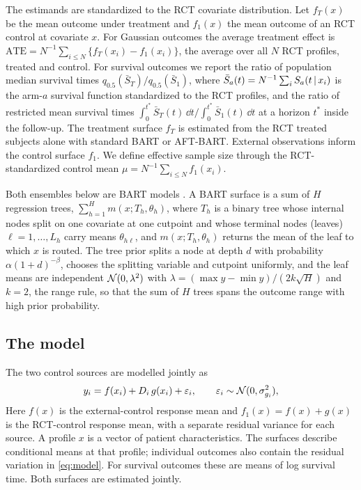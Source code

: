 The estimands are standardized to the RCT covariate distribution. Let $f_T(x)$ be the mean outcome under treatment and $f_1(x)$ the mean outcome of an RCT control at covariate $x$. For Gaussian outcomes the average treatment effect is $\mathrm{ATE}=N^{-1}\sum_{i\le N}\{f_T(x_i)-f_1(x_i)\}$, the average over all $N$ RCT profiles, treated and control. For survival outcomes we report the ratio of population median survival times $q_{0.5}(\bar S_T)/q_{0.5}(\bar S_1)$, where $\bar S_a(t)=N^{-1}\sum_i S_a(t\,\vert\, x_i)$ is the arm-$a$ survival function standardized to the RCT profiles, and the ratio of restricted mean survival times $\int_0^{t^\ast}\bar S_T(t)\,\dd t/\int_0^{t^\ast}\bar S_1(t)\,\dd t$ at a horizon $t^\ast$ inside the follow-up. The treatment surface $f_T$ is estimated from the RCT treated subjects alone with standard BART or AFT-BART. External observations inform the control surface $f_1$. We define effective sample size through the RCT-standardized control mean $\mu=N^{-1}\sum_{i\le N}f_1(x_i)$.

Both ensembles below are BART models \citep{Chipman2010BART}. A BART surface is a sum of $H$ regression trees, $\sum_{h=1}^H m(x;T_h,\theta_h)$, where $T_h$ is a binary tree whose internal nodes split on one covariate at one cutpoint and whose terminal nodes (leaves) $\ell=1,\dots,L_h$ carry means $\theta_{h\ell}$, and $m(x;T_h,\theta_h)$ returns the mean of the leaf to which $x$ is routed. The tree prior splits a node at depth $d$ with probability $\alpha(1+d)^{-\beta}$, chooses the splitting variable and cutpoint uniformly, and the leaf means are independent $\mathcal{N}(0,\lambda^2)$ with $\lambda=(\max y-\min y)/(2k\sqrt H)$ and $k=2$, the range rule, so that the sum of $H$ trees spans the outcome range with high prior probability.

\subsection{The model}
\label{sec:model}

The two control sources are modelled jointly as
\begin{equation}
y_i=f(x_i)+D_i\,g(x_i)+\varepsilon_i,\qquad \varepsilon_i\sim\mathcal{N}(0,\sigma^2_{g_i}),
\label{eq:model}
\end{equation}
Here $f(x)$ is the external-control response mean and $f_1(x)=f(x)+g(x)$ is the RCT-control response mean, with a separate residual variance for each source. A profile $x$ is a vector of patient characteristics. The surfaces describe conditional means at that profile; individual outcomes also contain the residual variation in \eqref{eq:model}. For survival outcomes these are means of log survival time. Both surfaces are estimated jointly.

